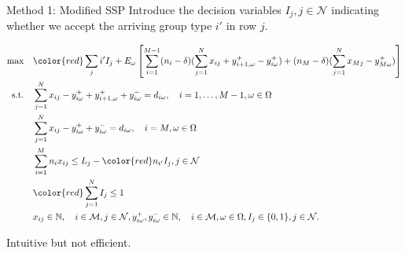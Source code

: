   \begin{frame}{Method 1: Modified SSP}
    \small
    Introduce the decision variables $I_j, j \in \mathcal{N}$ indicating whether we accept the arriving group type $i{'}$ in row $j$.
    
      \begin{tiny}
        \begin{equation}\label{adjusted_SSP}
        \begin{aligned}
        \max \quad & {\color{red}\sum_{j} i{'} I_j} + E_{\omega}\left[\sum_{i=1}^{M-1} (n_i-\delta) (\sum_{j= 1}^{N} x_{ij} + y_{i+1,\omega}^{+} - y_{i \omega}^{+}) + (n_{M}-\delta) (\sum_{j= 1}^{N} x_{Mj} - y_{M \omega}^{+})\right] \\
        \text {s.t.} \quad & \sum_{j= 1}^{N} x_{ij}-y_{i \omega}^{+}+
        y_{i+1, \omega}^{+} + y_{i \omega}^{-}=d_{i \omega}, \quad i = 1,\ldots,M-1, \omega \in \Omega \\
        & \sum_{j= 1}^{N} x_{ij} -y_{i \omega}^{+}+y_{i \omega}^{-}=d_{i \omega}, \quad i = M, \omega \in \Omega \\
        & \sum_{i=1}^{M} n_{i} x_{ij} \leq L_j - {\color{red}n_{i{'}} I_j}, j \in \mathcal{N} \\
        & {\color{red}\sum_{j=1}^{N} I_j \leq 1} \\
        & x_{ij} \in \mathbb{N}, \quad i \in \mathcal{M}, j \in \mathcal{N}, y_{i \omega}^{+}, y_{i \omega}^{-} \in \mathbb{N}, \quad i \in \mathcal{M}, \omega \in \Omega,  I_j \in \{0,1\}, j \in \mathcal{N}.
        \end{aligned}
      \end{equation}
    \end{tiny}
    Intuitive but not efficient.
  \end{frame}

      
      
  
  

